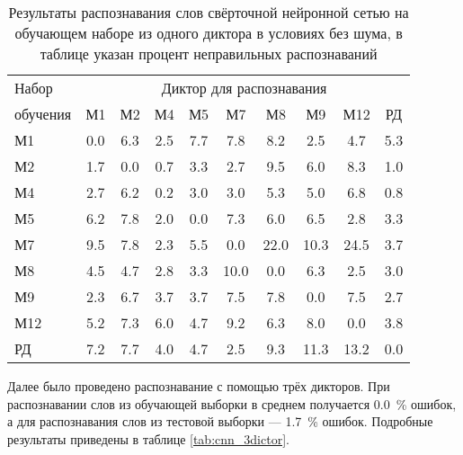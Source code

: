 \begin{table}[h]
	\centering
	\caption{Результаты распознавания слов свёрточной нейронной сетью на обучающем наборе из одного диктора в условиях без шума, в таблице указан процент неправильных распознаваний}
	\label{tab:cnn_1dictor}
	\begin{tabular}{| l | c | c | c | c | c | c | c | c | c |}
		\hline
		Набор & \multicolumn{9}{c|}{Диктор для распознавания} \\
		\hhline{~---------}
		обучения \phantom{00} & \phantom{0}М1\phantom{0} & \phantom{0}М2\phantom{0} & \phantom{0}М4\phantom{0} & \phantom{0}М5\phantom{0} & \phantom{0}М7\phantom{0} & \phantom{0}М8\phantom{0} & \phantom{0}М9\phantom{0} & \phantom{0}М12\phantom{0} & \phantom{0}РД\phantom{0} \\
		\hline
		М1		 & 0.0 & 6.3 & 2.5 & 7.7 &  7.8 &  8.2 &  2.5 &  4.7 & 5.3 \\
		М2		 & 1.7 & 0.0 & 0.7 & 3.3 &  2.7 &  9.5 &  6.0 &  8.3 & 1.0 \\
		М4		 & 2.7 & 6.2 & 0.2 & 3.0 &  3.0 &  5.3 &  5.0 &  6.8 & 0.8 \\
		М5		 & 6.2 & 7.8 & 2.0 & 0.0 &  7.3 &  6.0 &  6.5 &  2.8 & 3.3 \\
		М7		 & 9.5 & 7.8 & 2.3 & 5.5 &  0.0 & 22.0 & 10.3 & 24.5 & 3.7 \\
		М8		 & 4.5 & 4.7 & 2.8 & 3.3 & 10.0 &  0.0 &  6.3 &  2.5 & 3.0 \\
		М9		 & 2.3 & 6.7 & 3.7 & 3.7 &  7.5 &  7.8 &  0.0 &  7.5 & 2.7 \\
		М12		 & 5.2 & 7.3 & 6.0 & 4.7 &  9.2 &  6.3 &  8.0 &  0.0 & 3.8 \\
		РД		 & 7.2 & 7.7 & 4.0 & 4.7 &  2.5 &  9.3 & 11.3 & 13.2 & 0.0 \\
		\hline
	\end{tabular}
\end{table}

Далее было проведено распознавание с помощью трёх дикторов.
При распознавании слов из обучающей выборки в среднем получается 0.0~\% ошибок, а для распознавания слов из тестовой выборки --- 1.7~\% ошибок.
Подробные результаты приведены в таблице \ref{tab:cnn_3dictor}.

